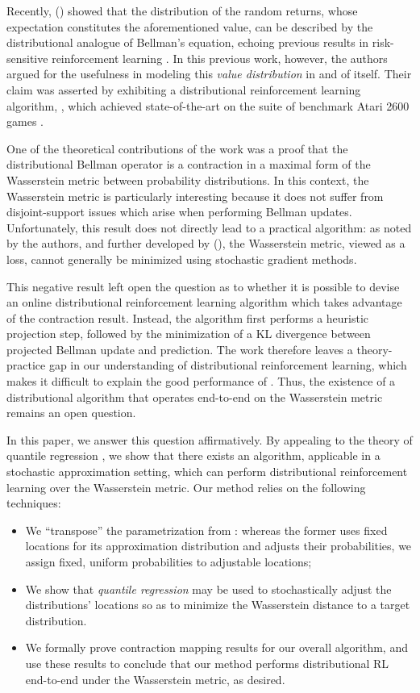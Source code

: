 \documentclass[letterpaper]{article}
\newcommand{\citet}[1]{\citeauthor{#1} (\citeyear{#1})}
\begin{document}
Recently, \citet{c51} showed that the distribution of the random returns, whose expectation constitutes the aforementioned value, can be described by the distributional analogue of Bellman's equation, echoing previous results in risk-sensitive reinforcement learning \cite{heger1994consideration,morimura10parametric,chow2015risk}. In this previous work, however, the authors argued for the usefulness in modeling this \emph{value distribution} in and of itself. Their claim was asserted by exhibiting a distributional reinforcement learning algorithm, , which achieved state-of-the-art on the suite of benchmark Atari 2600 games \cite{bellemare13arcade}.

One of the theoretical contributions of the  work was a proof that the distributional Bellman operator is a contraction in a maximal form of the Wasserstein metric between probability distributions. In this context, the Wasserstein metric is particularly interesting because it does not suffer from disjoint-support issues \cite{wgan} which arise when performing Bellman updates. Unfortunately, this result does not directly lead to a practical algorithm: as noted by the authors, and further developed by \citet{bellemare17cramer}, the Wasserstein metric, viewed as a loss, cannot generally be minimized using stochastic gradient methods. 

This negative result left open the question as to whether it is possible to devise an online distributional reinforcement learning algorithm which takes advantage of the contraction result. Instead, the  algorithm first performs a heuristic projection step, followed by the minimization of a KL divergence between projected Bellman update and prediction. The work therefore leaves a theory-practice gap in our understanding of distributional reinforcement learning, which makes it difficult to explain the good performance of . Thus, the existence of a distributional algorithm that operates end-to-end on the Wasserstein metric remains an open question.

In this paper, we answer this question affirmatively. By appealing to the theory of quantile regression \cite{qrbook}, we show that there exists an algorithm, applicable in a stochastic approximation setting, which can perform distributional reinforcement learning over the Wasserstein metric. Our method relies on the following techniques:
\begin{itemize}
    \item We ``transpose'' the parametrization from : whereas the former uses  fixed locations for its approximation distribution and adjusts their probabilities, we assign fixed, uniform probabilities to  adjustable locations;
    \item We show that \emph{quantile regression} may be used to stochastically adjust the distributions' locations so as to minimize the Wasserstein distance to a target distribution.
    \item We formally prove contraction mapping results for our overall algorithm, and use these results to conclude that our method performs distributional RL end-to-end under the Wasserstein metric, as desired.
\end{itemize}
\end{document}
